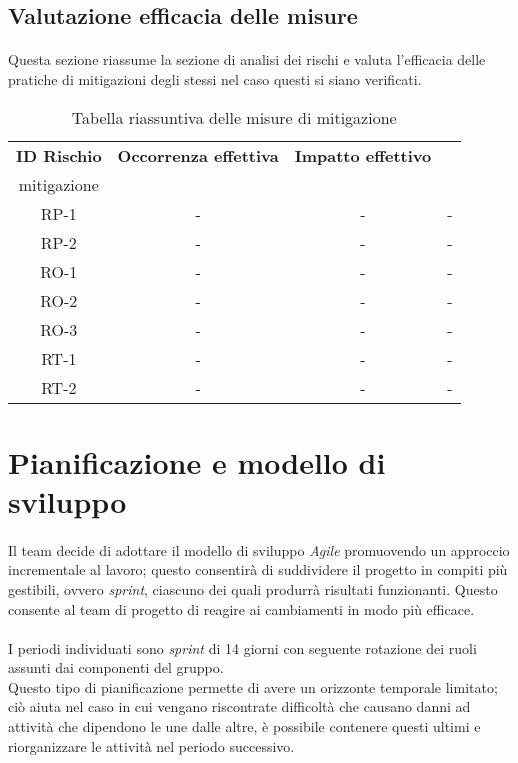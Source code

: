 \documentclass[10pt, a4paper]{article}
\begin{document}
{{{{{\subsection{Valutazione efficacia delle misure}
\paragraph{}Questa sezione riassume la sezione di analisi dei rischi e valuta l'efficacia delle pratiche di mitigazioni degli stessi nel caso questi si siano verificati.\\
{\renewcommand{\arraystretch}{1.5}
\begin{table}[H]
\begin{tabularx}{\textwidth}{c|c|c|X}
\textbf{ID Rischio} & \textbf{Occorrenza effettiva} & \textbf{Impatto effettivo} & \textbf{\quantities{Efficacia misure di \\mitigazione}} \\
\hline
RP-1 & - & - & -\\
\hline
RP-2 & - & - & - \\
\hline
RO-1 & - & - & -\\
\hline
RO-2 & - & - & -\\
\hline
RO-3 & - & - & -\\
\hline
RT-1 & - & - & -\\
\hline
RT-2 & - & - & -\\


\end{tabularx}
\caption{Tabella riassuntiva delle misure di mitigazione}
\end{table}


\section{Pianificazione e modello di sviluppo}

\paragraph{}Il team decide di adottare il modello di sviluppo \textit{Agile} 
promuovendo un approccio incrementale al lavoro; questo consentirà di suddividere il progetto in compiti più gestibili, ovvero \textit{sprint}, ciascuno dei quali produrrà risultati funzionanti. Questo consente al team di progetto di reagire ai cambiamenti in modo più efficace.\\
\paragraph{}I periodi individuati sono \textit{sprint} di 14 giorni con seguente rotazione dei ruoli assunti dai componenti del gruppo.\\
Questo tipo di pianificazione permette di avere un orizzonte temporale limitato; ciò aiuta nel caso in cui vengano riscontrate difficoltà che causano danni ad attività che dipendono le une dalle altre, è possibile contenere questi ultimi e riorganizzare le attività nel periodo successivo.
}}}}}}
\end{document}
